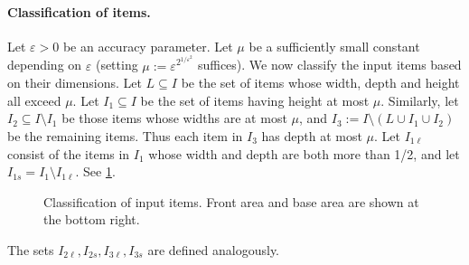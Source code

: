 \documentclass[10pt,a4paper]{amsart}
\newcommand{\kvnr}[1]{}
\renewcommand{\epsilon}{\varepsilon} %
\newtheorem{lemma}[theorem]{Lemma}
\theoremstyle{definition}
\newcommand{\opt}{\mathtt{opt}}
\begin{document}
\paragraph{Classification of items.}
Let $\epsilon>0$ be an accuracy parameter. Let $\mu$ be a sufficiently small constant depending on $\epsilon$ (setting $\mu:= \epsilon^{2^{1/\epsilon^2}}$ suffices). We now classify the input items based on their dimensions. Let $L\subseteq I$ be the set of items whose width, depth and height all exceed $\mu$. Let $I_1\subseteq I$ be the set of items having height at most $\mu$. Similarly, let $I_2\subseteq I\setminus I_1$ be those items whose widths are at most $\mu$, and $I_3 := I\setminus (L\cup I_1 \cup I_2)$ be the remaining items. Thus each item in $I_3$ has depth at most $\mu$.   
Let $I_{1\ell}$ consist of the items in $I_1$ whose width and depth are both more than 1/2, and let $I_{1s} = I_1 \setminus I_{1\ell}$.
See \cref{fig:input-items}.
\begin{figure}
    \centering
    
    \caption{Classification of input items. Front area and base area are shown at the bottom right.}
    \label{fig:input-items}
\end{figure}
The sets $I_{2\ell}, I_{2s}, I_{3\ell}, I_{3s}$ are defined analogously.
\end{document}
